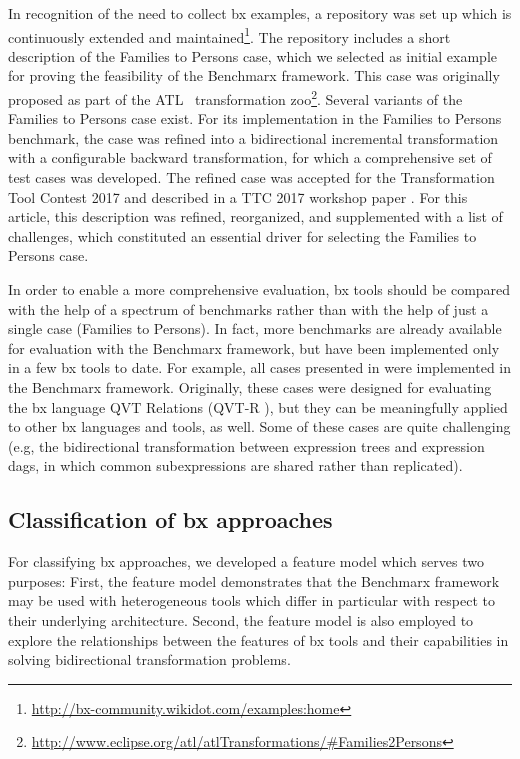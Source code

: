 In recognition of the need to collect bx examples, a repository \cite{Cheney2014} was set up which is continuously extended and maintained\footnote{\url{http://bx-community.wikidot.com/examples:home}}. The repository includes a short description of the Families to Persons case, which we selected as initial example for proving the feasibility of the Benchmarx framework. This case was originally proposed as part of the ATL~\cite{SCP-Jouault2008} transformation zoo\footnote{\url{http://www.eclipse.org/atl/atlTransformations/\#Families2Persons}}. Several variants of the Families to Persons case exist. For its implementation in the Families to Persons benchmark, the case was refined into a bidirectional incremental transformation with a configurable backward transformation, for which a comprehensive set of test cases was developed. The refined case was accepted for the Transformation Tool Contest 2017 and described in a TTC 2017 workshop paper \cite{Anjorin2017a}. For this article, this description was refined, reorganized, and supplemented with a list of challenges, which constituted an essential driver for selecting the Families to Persons case.

In order to enable a more comprehensive evaluation, bx tools should be compared with the help of a spectrum of benchmarks rather than with the help of just a single case (Families to Persons). In fact, more benchmarks are already available for evaluation with the Benchmarx framework, but have been implemented only in a few bx tools to date. For example, all cases presented in \cite{SoSym2018-Westfechtel} were implemented in the Benchmarx framework. Originally, these cases were designed for evaluating the bx language QVT Relations (QVT-R \cite{QVT-1.3}), but they can be meaningfully applied to other bx languages and tools, as well. Some of these cases are quite challenging (e.g, the bidirectional transformation between expression trees and expression dags, in which common subexpressions are shared rather than replicated).

\subsection{Classification of bx approaches}
\label{sec:ClassificationOfBxApproaches}

For classifying bx approaches, we developed a feature model which serves two purposes: First, the feature model demonstrates that the Benchmarx framework may be used with heterogeneous tools which differ in particular with respect to their underlying architecture. Second, the feature model is also employed to explore the relationships between the features of bx tools and their capabilities in solving bidirectional transformation problems. 

